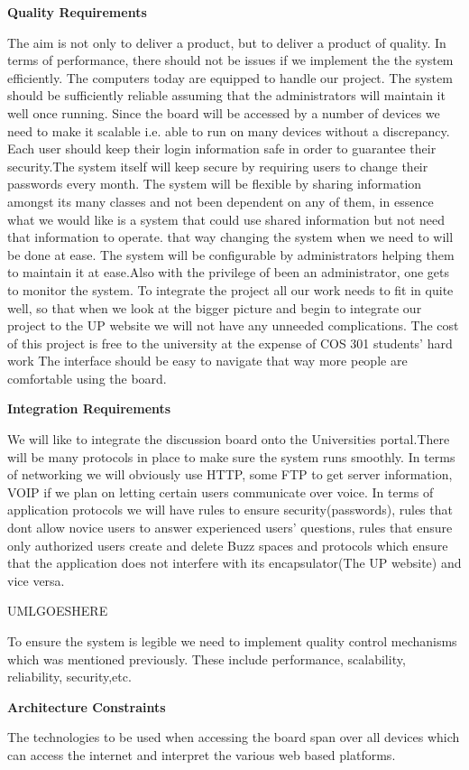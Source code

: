 \documentclass[12pt,a4paper]{article}
\begin{document}
\large  \bf Quality Requirements\par
\small The aim is not only to deliver a product, but to deliver a product of quality. In terms of performance, there should not be issues if we implement the the system efficiently. The computers today are equipped to handle our project.
The system should be sufficiently reliable assuming that the administrators will maintain it well once running.
Since the board will be accessed by a number of devices we need to make it scalable i.e. able to run on many devices without a discrepancy.
Each user should keep their login information safe in order to guarantee their security.The system itself will keep secure by requiring users to change their passwords every month.
The system will be flexible by sharing information amongst its many classes and not been dependent on any of them, in essence what we would like is a system that could use shared information but not need that information to operate. that way changing the system when we need to will be done at ease.
The system will be configurable by administrators helping them to maintain it at ease.Also with the privilege of been an administrator, one gets to monitor the system.\linebreak
To integrate the project all our work needs to fit in quite well, so that when we look at the bigger picture and begin to integrate our project to the UP website we will not have any unneeded complications. 
The cost of this project is free to the university at the expense of COS 301 students' hard work
The interface should be easy to navigate that way more people are comfortable using the board.\linebreak

\large  \bf Integration Requirements\par
\small\sf\par We will like to integrate the discussion board onto the Universities portal.There will be many protocols in place to make sure the system runs smoothly. In terms of networking we will obviously use HTTP, some FTP to get server information, VOIP if we plan on letting certain users communicate over voice. In terms of application protocols we will have rules to ensure security(passwords), rules that dont allow novice users to answer experienced users' questions, rules that ensure only authorized users create and delete Buzz spaces and protocols which ensure that the application does not interfere with its encapsulator(The UP website) and vice versa.\linebreak

  UMLGOESHERE\linebreak
  
To ensure the system is legible we need to implement quality control mechanisms which was mentioned previously. These include performance, scalability, reliability, security,etc.


\large  \bf Architecture Constraints\par
\small\sf\par The technologies to be used when accessing the board span over all devices which can access the internet and interpret the various web based platforms.
\end{document}

